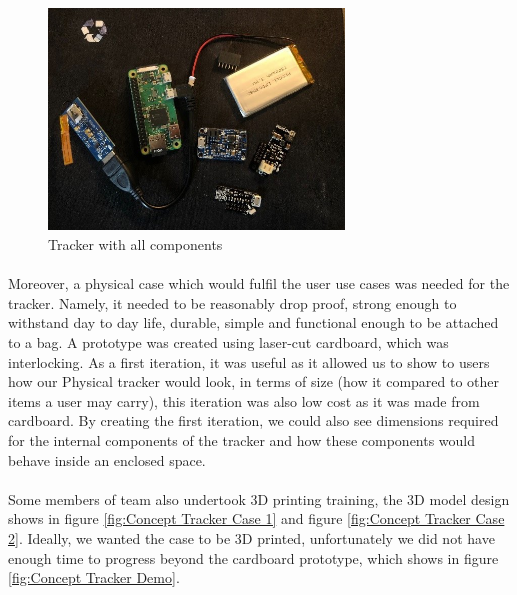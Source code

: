 \documentclass[12pt,a4paper]{article}
\begin{document}
        \begin{figure}[H]
          \centering
          \includegraphics[width=0.7\textwidth]{../assets/design-tracker-with-all-components.jpg}
          \caption{Tracker with all components}
          \label{fig:Tracker with all components}
        \end{figure}
        
        \paragraph{} Moreover, a physical case which would fulfil the user use cases was needed for the tracker. Namely, it needed to be reasonably drop proof, strong enough to withstand day to day life, durable, simple and functional enough to be attached to a bag. A prototype was created using laser-cut cardboard, which was interlocking. As a first iteration, it was useful as it allowed us to show to users how our Physical tracker would look, in terms of size (how it compared to other items a user may carry), this iteration was also low cost as it was made from cardboard. By creating the first iteration, we could also see dimensions required for the internal components of the tracker and how these components would behave inside an enclosed space.
        
        \paragraph{} Some members of team also undertook 3D printing training, the 3D model design shows in figure \ref{fig:Concept Tracker Case 1} and figure \ref{fig:Concept Tracker Case 2}. Ideally, we wanted the case to be 3D printed, unfortunately we did not have enough time to progress beyond the cardboard prototype, which shows in figure \ref{fig:Concept Tracker Demo}.
        
\end{document}
